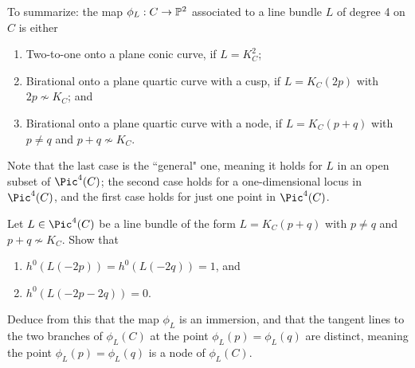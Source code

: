 To summarize: the map $\phi_L : C \to \PP^2$ associated to a line bundle $L$ of degree 4 on $C$ is either
\begin{enumerate}
\item Two-to-one onto a plane conic curve, if $L = K_C^2$;
\item Birational onto a plane quartic curve with a cusp, if $L = K_C(2p)$ with $2p \not\sim K_C$; and
\item Birational onto a plane quartic curve with a node, if $L = K_C(p+q)$ with $p \neq q$ and $p+q \not\sim K_C$.
\end{enumerate}

Note that the last case is the ``general" one, meaning it holds for $L$ in an open subset of $\Pic^4(C)$; the second case holds for a one-dimensional locus in $\Pic^4(C)$, and the first case holds for just one point in $\Pic^4(C)$.

\begin{exercise}
Let $L \in \Pic^4(C)$ be a line bundle of the form $L = K_C(p+q)$ with $p \neq q$ and $p+q \not\sim K_C$. Show that
\begin{enumerate}
\item $h^0(L(-2p)) = h^0(L(-2q)) = 1$, and
\item $h^0(L(-2p-2q)) = 0$.
\end{enumerate}
Deduce from this that the map $\phi_L$ is an immersion, and that the tangent lines to the two branches of $\phi_L(C)$ at the point $\phi_L(p) = \phi_L(q)$ are distinct, meaning the point $\phi_L(p) = \phi_L(q)$ is a node of $\phi_L(C)$.
\end{exercise}

%
%

